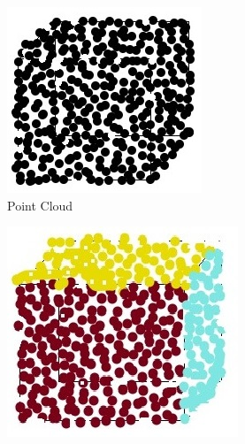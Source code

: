 \documentclass[12pt,a4paper]{article}
\begin{document}
    \begin{figure}
        \centering
        \begin{subfigure}[b]{0.23\textwidth}
            \centering
            \includegraphics[width=\textwidth]{point_cloud.jpg}
            \caption{Point Cloud}
             \label{fig:pcloud}
        \end{subfigure}%
        \quad \quad
        \begin{subfigure}[b]{0.23\textwidth}
            \centering
            \includegraphics[width=\textwidth]{cube1.jpg}

\end{subfigure}
\end{figure}
\end{document}
